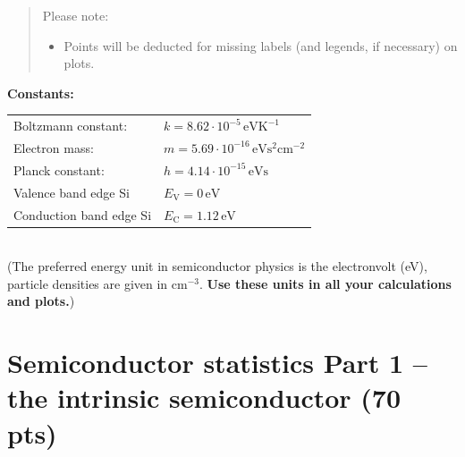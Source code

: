 \documentclass[11pt]{article}
\begin{document}
\begin{quote}
\begin{enumerate}
{\color{red}
\item Please note:
\begin{itemize}
\item Points will be deducted for missing labels (and legends, if necessary) on plots.
\end{itemize}
}
\end{enumerate}
\end{quote}

\newpage

\noindent\textbf{Constants:}\\

\begin{tabular}{ll}
Boltzmann constant:		&	$k=8.62\cdot10^{-5}\,\mathrm{eVK^{-1}}$\\
Electron mass:			&	$m=5.69\cdot10^{-16}\,\mathrm{eVs^2cm^{-2}}$\\
Planck constant:			&	$h=4.14\cdot10^{-15}\,\mathrm{eVs}$\\
Valence band edge Si		&	$E_\text{V}=0\,\mathrm{eV}$\\
Conduction band edge Si	&	$E_\text{C}=1.12\,\mathrm{eV}$
\end{tabular}\\

(The preferred energy unit in semiconductor physics is the electronvolt (eV), particle densities are given in $\mathrm{cm^{-3}}$. {\bf Use these units in all your calculations and plots.})\\

\section*{Semiconductor statistics Part 1  -- the intrinsic semiconductor (70 pts)}
\label{sec:lot}
\end{document}
